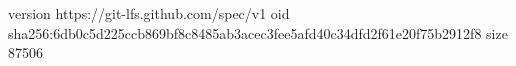 version https://git-lfs.github.com/spec/v1
oid sha256:6db0c5d225ccb869bf8c8485ab3acec3fee5afd40c34dfd2f61e20f75b2912f8
size 87506
